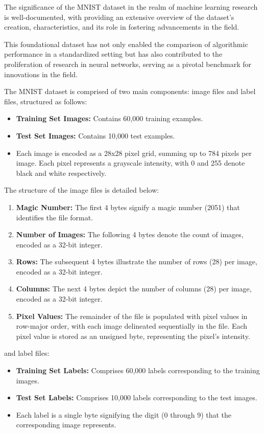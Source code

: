 The significance of the MNIST dataset in the realm of machine learning research is well-documented, with \cite{LeCun1998} providing an extensive overview of the dataset's creation, characteristics, and its role in fostering advancements in the field.

This foundational dataset has not only enabled the comparison of algorithmic performance in a standardized setting but has also contributed to the proliferation of research in neural networks, serving as a pivotal benchmark for innovations in the field.


The MNIST dataset is comprised of two main components: image files and label files, structured as follows:

\begin{itemize}
    \item \textbf{Training Set Images:} Contains 60,000 training examples.
    \item \textbf{Test Set Images:} Contains 10,000 test examples.
    \item Each image is encoded as a 28x28 pixel grid, summing up to 784 pixels per image. Each pixel represents a grayscale intensity, with 0 and 255 denote black and white respectively.
\end{itemize}

The structure of the image files is detailed below:
\begin{enumerate}
    \item \textbf{Magic Number:} The first 4 bytes signify a magic number (2051) that identifies the file format.
    \item \textbf{Number of Images:} The following 4 bytes denote the count of images, encoded as a 32-bit integer.
    \item \textbf{Rows:} The subsequent 4 bytes illustrate the number of rows (28) per image, encoded as a 32-bit integer.
    \item \textbf{Columns:} The next 4 bytes depict the number of columns (28) per image, encoded as a 32-bit integer.
    \item \textbf{Pixel Values:} The remainder of the file is populated with pixel values in row-major order, with each image delineated sequentially in the file. Each pixel value is stored as an unsigned byte, representing the pixel's intensity.
\end{enumerate}

and label files:
\begin{itemize}
    \item \textbf{Training Set Labels:} Comprises 60,000 labels corresponding to the training images.
    \item \textbf{Test Set Labels:} Comprises 10,000 labels corresponding to the test images.
    \item Each label is a single byte signifying the digit (0 through 9) that the corresponding image represents.
\end{itemize}

